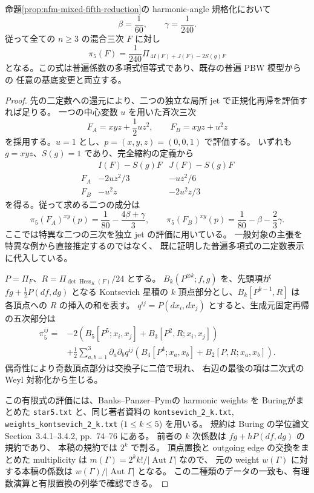 
\begin{proposition}
\label{prop:nfm-mixed-fifth-explicit}
命題\ref{prop:nfm-mixed-fifth-reduction}の harmonic-angle 規格化において
\[
 \beta=\frac1{60},\qquad \gamma=\frac1{240}.
\]
従って全ての $n\ge3$ の混合三次 $F$ に対し
\[
 \boxed{\quad\pi_5(F)=\frac1{240}\Pi_{\,4I(F)+J(F)-2S(g)F}\quad}
\]
となる。この式は普遍係数の多項式恒等式であり、既存の普遍 PBW 模型からの
任意の基底変更と両立する。
\end{proposition}

\begin{proof}
先の二定数への還元により、二つの独立な局所 jet で正規化再帰を評価すれば足りる。
一つの中心変数 $u$ を用いた斉次三次
\[
 F_A=xyz+\frac12uz^2,\qquad F_B=xyz+u^2z
\]
を採用する。$u=1$ とし、$p=(x,y,z)=(0,0,1)$ で評価する。
いずれも $g=xyz$、$S(g)=1$ であり、完全縮約の定義から
\[
\begin{array}{c|cc}
 &I(F)-S(g)F&J(F)-S(g)F\\\hline
 F_A&-2uz^2/3&-uz^2/6\\
 F_B&-u^2z&-2u^2z/3
\end{array}
\]
を得る。従って求める二つの成分は
\[
 \pi_5(F_A)^{xy}(p)=\frac1{80}-\frac{4\beta+\gamma}{3},\qquad
 \pi_5(F_B)^{xy}(p)=\frac1{80}-\beta-\frac23\gamma.
\]
ここでは特異な二つの三次を独立 jet の評価に用いている。
一般対象の主張を特異な例から直接推定するのではなく、
既に証明した普遍多項式の二定数表示に代入している。

$P=\Pi_F$、$R=\Pi_{\det\operatorname{Hess}_K(F)}/24$ とする。
$B_k(P^{\otimes k};f,g)$ を、先頭項が $fg+\frac12 P(df,dg)$ となる
Kontsevich 星積の $k$ 頂点部分とし、$B_k[P^{k-1},R]$ は
各頂点への $R$ の挿入の和を表す。
$q^{ij}=P(dx_i,dx_j)$ とすると、生成元固定再帰の五次部分は
\begin{align*}
 \pi_5^{ij}
 ={}&-2\left(B_5[P^5;x_i,x_j]+B_3[P^2,R;x_i,x_j]\right)\\
 &+\frac12\sum_{a,b=1}^3 \partial_a\partial_b q^{ij}
 \left(B_4[P^4;x_a,x_b]+B_2[P,R;x_a,x_b]\right).
\end{align*}
偶奇性により奇数頂点部分は交換子に二倍で現れ、
右辺の最後の項は二次式の Weyl 対称化から生じる。

この有限式の評価には、Banks--Panzer--Pym\cite[Corollary~1.3; Section~6]{NFMBanksPanzerPym}の harmonic weights を
Buring\cite[Sections~3.4--3.6]{NFMBuringGraphs}がまとめた \texttt{star5.txt} と、同じ著者資料の
\texttt{kontsevich\_2\_k.txt},
\texttt{weights\_kontsevich\_2\_k.txt} ($1\le k\le5$) を用いる。
規約は Buring の学位論文 Section~3.4.1--3.4.2, pp.~74--76 にある。
前者の $k$ 次係数は $fg+hP(df,dg)$ の規約であり、
本稿の規約では $2^k$ で割る。
頂点置換と outgoing edge の交換をまとめた multiplicity は
$m(\Gamma)=2^k k!/|\operatorname{Aut}\Gamma|$ なので、
元の weight $w(\Gamma)$ に対する本稿の係数は
$w(\Gamma)/|\operatorname{Aut}\Gamma|$ となる。
この二種類のデータの一致も、有理数演算と有限置換の列挙で確認できる。


\end{proof}
